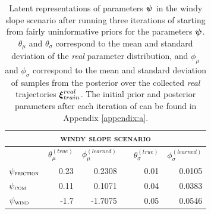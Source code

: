 \begin{table}
\centering
\begin{tabular}{lrrcrr}
\multicolumn{6}{c}{\textsc{windy slope scenario}} \\
\toprule
& $\theta_\mu^{(true)}$ & $\phi_\mu^{(learned)}$ && $\theta_\sigma^{(true)}$ & $\phi_\sigma^{(learned)}$ \\
\midrule

$\psi_{\textsc{friction}}$ & 0.23 & 0.2308 && 0.01 & 0.0105 \\
$\psi_{\textsc{com}}$ & 0.11 & 0.1071 && 0.04 & 0.0383 \\
$\psi_{\textsc{wind}}$ & -1.7 & -1.7075 && 0.05 & 0.0546 \\
\bottomrule
\end{tabular}
\caption{Latent representations of parameters $\boldsymbol{\psi}$ in the windy slope scenario after running three iterations of \dettostoc{} starting from fairly uninformative priors for the parameters $\boldsymbol{\psi}$. $\theta_\mu$ and $\theta_\sigma$ correspond to the mean and standard deviation of the \emph{real} parameter distribution, and $\phi_\mu$ and $\phi_\sigma$ correspond to the mean and standard deviation of samples from the posterior over the collected \emph{real} trajectories $\boldsymbol{\xi}^{real}_{train}$. The initial prior and posterior parameters after each iteration of \dettostoc{} can be found in Appendix \ref{appendix:a}.}
\label{fig:windyslope_parameters_table}
\end{table}

